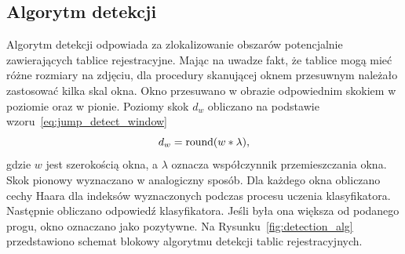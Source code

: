 \subsection{Algorytm detekcji}
Algorytm detekcji odpowiada za zlokalizowanie obszarów potencjalnie zawierających tablice rejestracyjne.
Mając na uwadze fakt, że tablice mogą mieć różne rozmiary na zdjęciu, dla procedury skanującej oknem przesuwnym należało zastosować kilka skal okna.
Okno przesuwano w obrazie odpowiednim skokiem w poziomie oraz w pionie.
Poziomy skok $d_w$ obliczano na podstawie wzoru~\eqref{eq:jump_detect_window}
\begin{equation}
    \label{eq:jump_detect_window}
    d_w = \operatorname{round}(w * \lambda),
\end{equation}
gdzie $w$ jest szerokością okna, a $\lambda$ oznacza współczynnik przemieszczania okna.
Skok pionowy wyznaczano w analogiczny sposób.
Dla każdego okna obliczano cechy Haara dla indeksów wyznaczonych podczas procesu uczenia klasyfikatora.
Następnie obliczano odpowiedź klasyfikatora.
Jeśli była ona większa od podanego progu, okno oznaczano jako pozytywne.
Na Rysunku~\ref{fig:detection_alg} przedstawiono schemat blokowy algorytmu detekcji tablic rejestracyjnych.
